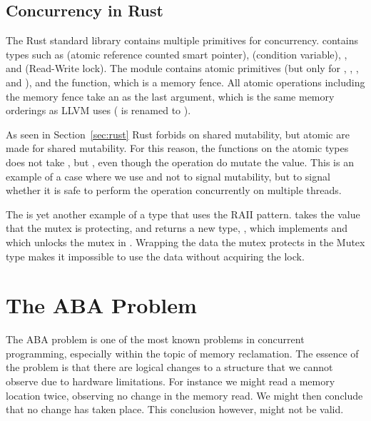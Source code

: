 \documentclass[b5paper]{report}
\begin{document}
\subsection{Concurrency in Rust}

The Rust standard library contains multiple primitives for concurrency.
 contains types such as  (atomic reference counted
smart pointer),  (condition variable), , and
 (Read-Write lock). The  module contains
atomic primitives (but only for , , , and
), and the  function, which is a memory fence. All atomic
operations including the memory fence take an  as the last
argument, which is the same memory orderings as LLVM uses ( is
renamed to ).

As seen in Section~\ref{sec:rust} Rust forbids on shared mutability, but atomic
are made for shared mutability. For this reason, the functions on the atomic
types does not take , but , even though the
operation do mutate the value. This is an example of a case where we use
 and \code{\&} not to signal mutability, but to signal whether it
is safe to perform the operation concurrently on multiple threads.

The  is yet another example of a type that uses the RAII pattern.
 takes the value that the mutex is protecting, and
 returns a new type, , which implements
 and which unlocks the mutex in . Wrapping the data
the mutex protects in the Mutex type makes it impossible to use the data without
acquiring the lock.


\section{The ABA Problem\label{sec:aba}}

The ABA problem is one of the most known problems in concurrent programming,
especially within the topic of memory reclamation. The essence of the problem is
that there are logical changes to a structure that we cannot observe due to
hardware limitations. For instance we might read a memory location twice,
observing no change in the memory read. We might then conclude that no change
has taken place. This conclusion however, might not be valid.
\end{document}
